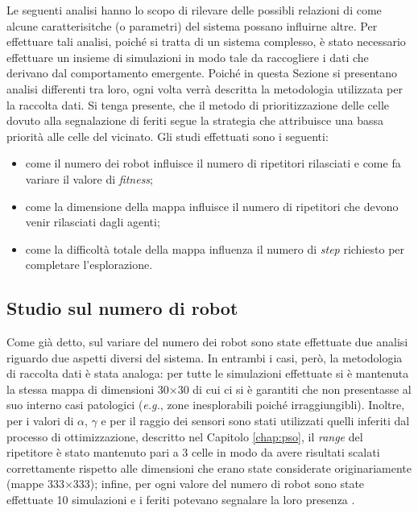 Le seguenti analisi hanno lo scopo di rilevare delle possibli relazioni di come alcune caratterisitche (o parametri) del sistema possano influirne altre.
Per effettuare tali analisi, poiché si tratta di un sistema complesso, è stato necessario effettuare un insieme di simulazioni in modo tale da raccogliere i dati che derivano dal comportamento emergente.
Poiché in questa Sezione si presentano analisi differenti tra loro, ogni volta verrà descritta la metodologia utilizzata per la raccolta dati.
Si tenga presente, che il metodo di prioritizzazione delle celle dovuto alla segnalazione di feriti segue la strategia che attribuisce una bassa priorità alle celle del vicinato.
Gli studi effettuati sono i seguenti:\begin{itemize}
	\item come il numero dei robot influisce il numero di ripetitori rilasciati e come fa variare il valore di \textit{fitness};
	\item come la dimensione della mappa influisce il numero di ripetitori che devono venir rilasciati dagli agenti;
	\item come la difficoltà totale della mappa influenza il numero di \textit{step} richiesto per completare l'esplorazione.
\end{itemize}
\subsection{Studio sul numero di robot}
\label{subsec:nrobots}
Come già detto, sul variare del numero dei robot sono state effettuate due analisi riguardo due aspetti diversi del sistema.
In entrambi i casi, però, la metodologia di raccolta dati è stata analoga: per tutte le simulazioni effettuate si è mantenuta la stessa mappa di dimensioni 30$\times$30 di cui ci si è garantiti che non presentasse al suo interno casi patologici (\textit{e.g.}, zone inesplorabili poiché irraggiungibli).
Inoltre, per i valori di $\alpha$, $\gamma$ e per il raggio dei sensori sono stati utilizzati quelli inferiti dal processo di ottimizzazione, descritto nel Capitolo \ref{chap:pso}, il \textit{range} del ripetitore è stato mantenuto pari a 3 celle in modo da avere risultati scalati correttamente rispetto alle dimensioni che erano state considerate originariamente (mappe 333$\times$333); infine, per ogni valore del numero di robot sono state effettuate 10 simulazioni e i feriti potevano segnalare la loro presenza .


